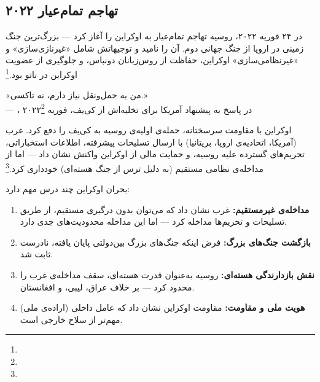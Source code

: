 \subsection{تهاجم تمام‌عیار ۲۰۲۲}
\label{subsec:ch10-ukraine-2022}

در ۲۴ فوریه ۲۰۲۲، روسیه تهاجم تمام‌عیار به اوکراین را آغاز کرد — بزرگ‌ترین جنگ زمینی در اروپا از جنگ جهانی دوم.  آن را  نامید و توجیهاتش شامل «غیرنازی‌سازی» و «غیرنظامی‌سازی» اوکراین، حفاظت از روس‌زبانان دونباس، و جلوگیری از عضویت اوکراین در ناتو بود.\footnote{}

\begin{tcolorbox}[quotebox, title={نقل‌قول تاریخی}]
«من به حمل‌ونقل نیاز دارم، نه تاکسی.»\\
— ، در پاسخ به پیشنهاد آمریکا برای تخلیه‌اش از کی‌یف، فوریه ۲۰۲۲\footnote{}
\end{tcolorbox}

اوکراین با مقاومت سرسختانه، حمله‌ی اولیه‌ی روسیه به کی‌یف را دفع کرد. غرب (آمریکا، اتحادیه‌ی اروپا، بریتانیا) با ارسال تسلیحات پیشرفته، اطلاعات استخباراتی، تحریم‌های گسترده علیه روسیه، و حمایت مالی از اوکراین واکنش نشان داد — اما از مداخله‌ی نظامی مستقیم (به دلیل ترس از جنگ هسته‌ای) خودداری کرد.\footnote{}

\begin{tcolorbox}[wavebox, title={تحلیل: اوکراین و پارادوکس نجات‌طلبی}]
بحران اوکراین چند درس مهم دارد:
\begin{enumerate}
\item \textbf{مداخله‌ی غیرمستقیم:} غرب نشان داد که می‌توان بدون درگیری مستقیم، از طریق تسلیحات و تحریم‌ها مداخله کرد — اما این مداخله محدودیت‌های جدی دارد.
\item \textbf{بازگشت جنگ‌های بزرگ:} فرض اینکه جنگ‌های بزرگ بین‌دولتی پایان یافته، نادرست ثابت شد.
\item \textbf{نقش بازدارندگی هسته‌ای:} روسیه به‌عنوان قدرت هسته‌ای، سقف مداخله‌ی غرب را محدود کرد — بر خلاف عراق، لیبی، و افغانستان.
\item \textbf{هویت ملی و مقاومت:} مقاومت اوکراین نشان داد که عامل داخلی (اراده‌ی ملی) مهم‌تر از سلاح خارجی است.
\end{enumerate}
\end{tcolorbox}


